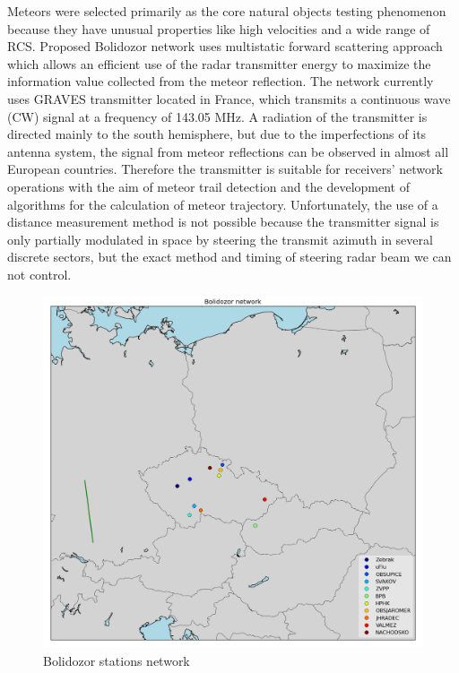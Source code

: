 \documentclass[twoside]{ctuthesis}
\theoremstyle{plain}
\theoremstyle{definition}
\theoremstyle{note}
\begin{document}
Meteors were selected primarily as the core natural objects testing phenomenon because they have unusual properties like high velocities and a wide range of RCS.
Proposed Bolidozor network \cite{Bolidozor} uses multistatic forward scattering approach which allows an efficient use of the radar transmitter energy to maximize the information value collected from the meteor reflection.
The network currently uses GRAVES \cite{GRAVES_radar} transmitter located in France, which transmits a continuous wave (CW) signal at a frequency of 143.05 MHz. A radiation of the transmitter is directed mainly to the south hemisphere, but due to the imperfections of its antenna system, the signal from meteor reflections can be observed in almost all European countries. Therefore the transmitter is suitable for receivers' network operations with the aim of meteor trail detection and the development of algorithms for the calculation of meteor trajectory. Unfortunately, the use of a distance measurement method is not possible because the transmitter signal is only partially modulated in space by steering the transmit azimuth in several discrete sectors, but the exact method and timing of steering radar beam we can not control. 

\begin{figure}
 \begin{center}
 \includegraphics[width=\linewidth]{./img/stanice_mapa.png}
 \caption{Bolidozor stations network}
  \label{fig:stanice_mapa} 
 \end{center}
\end{figure}
                   
\end{document}
